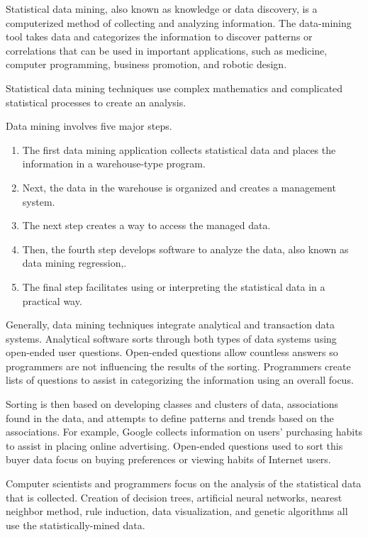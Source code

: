 \documentclass[11pt]{article} %
\begin{document}
Statistical data mining, also known as knowledge or data discovery, is a computerized method of collecting and analyzing information. The data-mining tool takes data and categorizes the information to discover patterns or correlations that can be used in important applications, such as medicine, computer programming, business promotion, and robotic design. 


Statistical data mining techniques use complex mathematics and complicated statistical processes to create an analysis.


Data mining involves five major steps. 

\begin{enumerate}
\item The first data mining application collects statistical data and places the information in a warehouse-type program. 

\item Next, the data in the warehouse is organized and creates a management system. 

\item The next step creates a way to access the managed data. 

\item Then, the fourth step develops software to analyze the data, also known as data mining regression,. 

\item The final step facilitates using or interpreting the statistical data in a practical way.
\end{enumerate}

Generally, data mining techniques integrate analytical and transaction data systems. Analytical software sorts through both types of data systems using open-ended user questions. Open-ended questions allow countless answers so programmers are not influencing the results of the sorting. Programmers create lists of questions to assist in categorizing the information using an overall focus.


Sorting is then based on developing classes and clusters of data, associations found in the data, and attempts to define patterns and trends based on the associations. For example, Google collects information on users' purchasing habits to assist in placing online advertising. Open-ended questions used to sort this buyer data focus on buying preferences or viewing habits of Internet users.


Computer scientists and programmers focus on the analysis of the statistical data that is collected. Creation of decision trees, artificial neural networks, nearest neighbor method, rule induction, data visualization, and genetic algorithms all use the statistically-mined data. 
\end{document}

